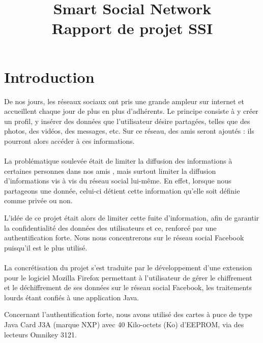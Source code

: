 \documentclass[a4paper,11pt,french]{article}
\title{Smart Social Network\\Rapport de projet SSI }
\begin{document}
\maketitle

\tableofcontents

\section{Introduction}
\renewcommand\labelitemi{\textbullet} %
\renewcommand\labelitemii{$\circ$} %
De nos jours, les réseaux sociaux ont pris une grande ampleur sur internet
et accueillent chaque jour de plus en plus d'adhérents. Le principe consiste à 
y créer un profil, y insérer des données que l'utilisateur désire partagées, 
telles que des photos, des vidéos, des messages, etc. Sur ce réseau, des \og{}amis \fg{}
seront ajoutés : ils pourront alors accéder à ces informations.

\paragraph{}
La problématique soulevée était de limiter la diffusion des informations à 
certaines personnes dans nos \og{}amis \fg{}, mais surtout limiter la diffusion 
d'informations vis à vis du réseau social lui-même. En effet, lorsque nous 
partageons une donnée, celui-ci détient cette information qu'elle soit définie
comme privée ou non.

L'idée de ce projet était alors de limiter cette fuite d'information, afin de 
garantir la confidentialité des données des utilisateurs et ce, renforcé par une
authentification forte. Nous nous concentrerons sur le réseau social Facebook 
puisqu'il est le plus utilisé.


\paragraph{}
La concrétisation du projet s'est traduite par le développement d'une extension 
pour le logiciel Mozilla Firefox permettant à l’utilisateur de gérer le 
chiffrement et le déchiffrement de ses données sur le réseau social Facebook, 
les traitements lourds étant confiés à une application Java.

Concernant l’authentification forte, nous avons utilisé des cartes à puce de 
type Java Card J3A (marque NXP) avec 40 Kilo-octets (Ko) d'EEPROM, via des 
lecteurs Omnikey 3121. 
\end{document}
